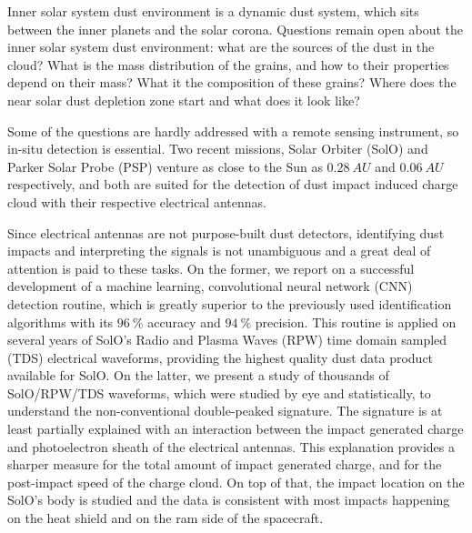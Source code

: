 Inner solar system dust environment is a dynamic dust system, which sits between the inner planets and the solar corona. Questions remain open about the inner solar system dust environment: what are the sources of the dust in the cloud? What is the mass distribution of the grains, and how to their properties depend on their mass? What it the composition of these grains? Where does the near solar dust depletion zone start and what does it look like? 

Some of the questions are hardly addressed with a remote sensing instrument, so in-situ detection is essential. Two recent missions, Solar Orbiter (SolO) and Parker Solar Probe (PSP) venture as close to the Sun as $\SI{0.28}{AU}$ and $\SI{0.06}{AU}$ respectively, and both are suited for the detection of dust impact induced charge cloud with their respective electrical antennas. 

Since electrical antennas are not purpose-built dust detectors, identifying dust impacts and interpreting the signals is not unambiguous and a great deal of attention is paid to these tasks. On the former, we report on a successful development of a machine learning, convolutional neural network (CNN) detection routine, which is greatly superior to the previously used identification algorithms with its $\SI{96}{\%}$ accuracy and $\SI{94}{\%}$ precision. This routine is applied on several years of SolO's Radio and Plasma Waves (RPW) time domain sampled (TDS) electrical waveforms, providing the highest quality dust data product available for SolO. On the latter, we present a study of thousands of SolO/RPW/TDS waveforms, which were studied by eye and statistically, to understand the non-conventional double-peaked signature. The signature is at least partially explained with an interaction between the impact generated charge and photoelectron sheath of the electrical antennas. This explanation provides a sharper measure for the total amount of impact generated charge, and for the post-impact speed of the charge cloud. On top of that, the impact location on the SolO's body is studied and the data is consistent with most impacts happening on the heat shield and on the ram side of the spacecraft.

